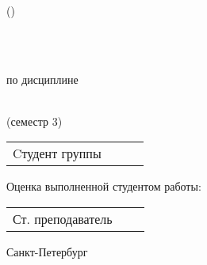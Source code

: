 \thispagestyle{empty}%
\makeatletter
{}
%
\makeatother

{\centering%
	\Ministry\\
	\SPbPUOfficialPrefix\\
	\SPbPU\\
	(\SPbPUOfficialShort)\\
	\institute \\
	\highSchool
\par}%


\vspace{0pt plus3fill} %


\vspace{0pt plus2fill} %


{\centering%
	
	\MakeUppercase{\bfseries{}\DocType} \\ 

}\par%

\intervalS%
\noindent	по дисциплине \thesisSpecialtyCodeAndTitle{}\\ 
\par%
{\centering
	 \thesisTitle \\
	 (семестр 3)
\par}




\vspace{4mm plus2fill}%

\noindent
\begin{tabularx}{\linewidth}{lXl}
	Cтудент группы ~\group     &    & \Author     \\[\mfloatsep]

\end{tabularx} %

{\centering
	Оценка выполненной студентом работы: \\
\par}

\noindent
\begin{tabularx}{\linewidth}{lXl}
	Ст. преподаватель     &    & \Supervisor     \\[\mfloatsep]
	
\end{tabularx} %

%
\vspace{0pt plus4fill}%


\begin{center}%
Санкт-Петербург\\
\thesisYear
\end{center}%
\restoregeometry
\newpage